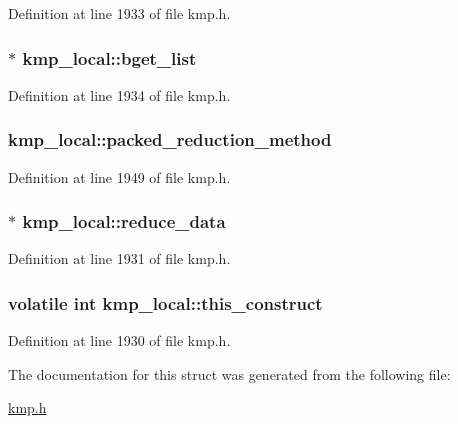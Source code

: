 Definition at line 1933 of file kmp.\-h.

\hypertarget{structkmp__local_a3a0e1b35577fdbd6a0a0baead836840c}{
\subsubsection[{bget\-\_\-list}]{$\ast$ kmp\-\_\-local\-::bget\-\_\-list}}\label{structkmp__local_a3a0e1b35577fdbd6a0a0baead836840c}


Definition at line 1934 of file kmp.\-h.

\hypertarget{structkmp__local_ab9ff578e63fb39dbc41446e9151ef801}{
\subsubsection[{packed\-\_\-reduction\-\_\-method}]{ kmp\-\_\-local\-::packed\-\_\-reduction\-\_\-method}}\label{structkmp__local_ab9ff578e63fb39dbc41446e9151ef801}


Definition at line 1949 of file kmp.\-h.

\hypertarget{structkmp__local_a4c051e7be68eeeda40a045f7bf9e31c3}{
\subsubsection[{reduce\-\_\-data}]{$\ast$ kmp\-\_\-local\-::reduce\-\_\-data}}\label{structkmp__local_a4c051e7be68eeeda40a045f7bf9e31c3}


Definition at line 1931 of file kmp.\-h.

\hypertarget{structkmp__local_ae1dbf9207545d97a14c37d5fbeb4a4b8}{
\subsubsection[{this\-\_\-construct}]{\setlength{\rightskip}{0pt plus 5cm}volatile {\bf int} kmp\-\_\-local\-::this\-\_\-construct}}\label{structkmp__local_ae1dbf9207545d97a14c37d5fbeb4a4b8}


Definition at line 1930 of file kmp.\-h.



The documentation for this struct was generated from the following file\-:\begin{DoxyCompactItemize}
\item 
\hyperlink{kmp_8h}{kmp.\-h}\end{DoxyCompactItemize}
